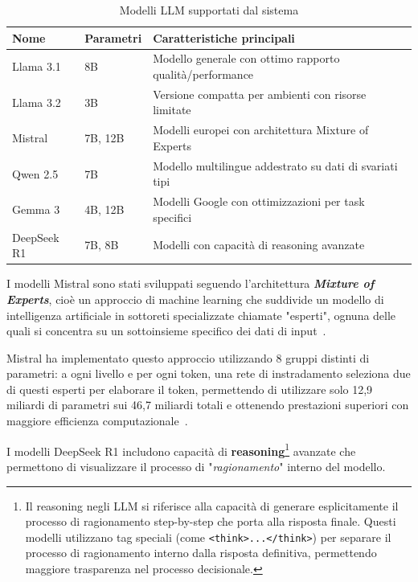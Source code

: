 \documentclass[12pt,twoside]{report}
\begin{document}
\begin{table}[h!]
    \centering
    \begin{tabular}{|p{}|p{}|p{}|}
        \hline
        \textbf{Nome} & \textbf{Parametri} & \textbf{Caratteristiche principali}                        \\ \hline
        Llama 3.1     & 8B                 & Modello generale con ottimo rapporto qualità/performance   \\ \hline
        Llama 3.2     & 3B                 & Versione compatta per ambienti con risorse limitate        \\ \hline
        Mistral       & 7B, 12B            & Modelli europei con architettura Mixture of Experts        \\ \hline
        Qwen 2.5      & 7B                 & Modello multilingue addestrato su dati di svariati tipi    \\ \hline
        Gemma 3       & 4B, 12B            & Modelli Google con ottimizzazioni per task specifici       \\ \hline
        DeepSeek R1   & 7B, 8B             & Modelli con capacità di reasoning avanzate                 \\ \hline
    \end{tabular}
    \caption{Modelli LLM supportati dal sistema}
    \label{tab:modelli_llm}
\end{table}

I modelli Mistral sono stati sviluppati seguendo l'architettura \textbf{\textit{Mixture of Experts}}, cioè un approccio di machine learning che suddivide un modello di intelligenza artificiale in sottoreti specializzate chiamate "esperti", ognuna delle quali si concentra su un sottoinsieme specifico dei dati di input~\cite{mu2025moe_survey, ibm_moe}.

Mistral ha implementato questo approccio utilizzando 8 gruppi distinti di parametri: a ogni livello e per ogni token, una rete di instradamento seleziona due di questi esperti per elaborare il token, permettendo di utilizzare solo 12,9 miliardi di parametri sui 46,7 miliardi totali e ottenendo prestazioni superiori con maggiore efficienza computazionale~\cite{mistral_moe}.

I modelli DeepSeek R1 includono capacità di \textbf{reasoning}\footnote{Il reasoning negli LLM si riferisce alla capacità di generare esplicitamente il processo di ragionamento step-by-step che porta alla risposta finale. Questi modelli utilizzano tag speciali (come \texttt{<think>...</think>}) per separare il processo di ragionamento interno dalla risposta definitiva, permettendo maggiore trasparenza nel processo decisionale.} avanzate che permettono di visualizzare il processo di "\textit{ragionamento}" interno del modello.
\end{document}
